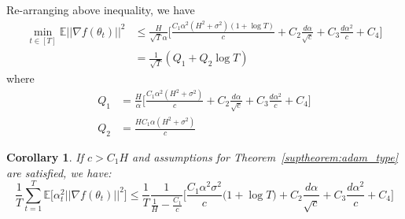\documentclass{article}
\newtheorem{corollary}{Corollary}[theorem]
\begin{document}
Re-arranging above inequality, we have
\begin{align}
\label{supeq:bound6}
\operatorname*{min}_{t \in [T]} \mathbb{E} \Big \vert \Big \vert \nabla f(\theta_t )  \Big \vert \Big \vert^2 &\leq \frac{H}{\sqrt{T} \alpha} \Big[ \frac{C_1 \alpha^2 (H^2 + \sigma^2)(1+\log T)}{c} + C_2 \frac{d \alpha}{\sqrt{c}} + C_3 \frac{d \alpha^2}{c} + C_4 \Big] \nonumber \\
&= \frac{1}{\sqrt{T}} (Q_1 + Q_2 \log T)
\end{align}
where 
\begin{align}
Q_1&= \frac{H}{\alpha} \Big[ \frac{C_1 \alpha^2 (H^2 + \sigma^2)}{c} + C_2 \frac{d \alpha}{\sqrt{c}} + C_3 \frac{d \alpha^2}{c} + C_4 \Big] \\
Q_2&= \frac{H C_1 \alpha (H^2 + \sigma^2)}{c}
\end{align}
\hfill \qedsymbol

\begin{corollary}
If $c > C_1 H$ and assumptions for Theorem~\ref{suptheorem:adam_type} are satisfied, we have:
\begin{equation}
\frac{1}{T}\sum_{t=1}^T \mathbb{E} \Big[ \alpha_t^2 \Big \vert \Big \vert \nabla f(\theta_t ) \Big \vert \Big \vert^2 \Big] \leq \frac{1}{T} \frac{1}{\frac{1}{H} - \frac{C_1}{c}} \Bigg[ \frac{C_1 \alpha^2 \sigma^2}{c} \big(1+\log T \big) + C_2 \frac{d \alpha}{\sqrt{c}} + C_3 \frac{d \alpha^2}{c} + C_4 \Bigg] %
\end{equation}
\end{corollary}
\end{document}
